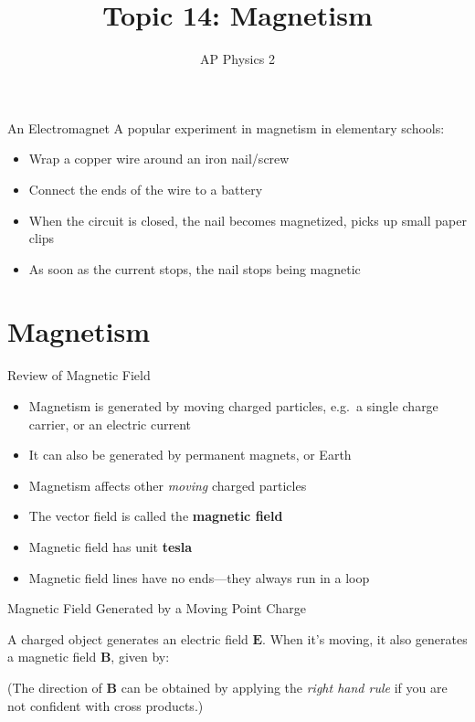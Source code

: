 \documentclass[12pt,aspectratio=169]{beamer}
\title{Topic 14: Magnetism}
\subtitle{AP Physics 2}
\begin{document}
\begin{frame}
  \maketitle
\end{frame}


\begin{frame}{An Electromagnet}
  A popular experiment in magnetism in elementary schools:
  \begin{itemize}
  \item Wrap a copper wire around an iron nail/screw
  \item Connect the ends of the wire to a battery
  \item When the circuit is closed, the nail becomes magnetized, picks up
    small paper clips
  \item As soon as the current stops, the nail stops being magnetic
  \end{itemize}
  \begin{center}
  \end{center}
\end{frame}


\section{Magnetism}

\begin{frame}{Review of Magnetic Field}
  \begin{itemize}
  \item Magnetism is generated by moving charged particles, e.g.\ a single
    charge carrier, or an electric current
  \item It can also be generated by permanent magnets, or Earth
  \item Magnetism affects other \emph{moving} charged particles
  \item The vector field is called the \textbf{magnetic field}
  \item Magnetic field has unit \textbf{tesla}
  \item Magnetic field lines have no ends---they always run in a loop
  \end{itemize}
\end{frame}



\begin{frame}{Magnetic Field Generated by a Moving Point Charge}
  \begin{center}
  \end{center}
  A charged object generates an electric field $\bm{E}$. When it's moving, it
  also generates a magnetic field $\bm{B}$, given by:


  \vspace{-.1in}(The direction of $\bm{B}$ can be obtained by applying the
  \emph{right hand rule} if you are not confident with cross products.)
\end{frame}
\end{document}
